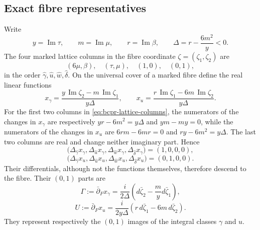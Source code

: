 \subsection{Exact fibre representatives}

Write
\begin{equation}
 y=\operatorname{Im}\tau,
 \qquad m=\operatorname{Im}\mu,
 \qquad r=\operatorname{Im}\beta,
 \qquad \Delta=r-\frac{6m^2}{y}<0.
\label{eq:bcpr-delta}
\end{equation}
The four marked lattice columns in the fibre coordinate
$\zeta=(\zeta_1,\zeta_2)$ are
\begin{equation}
 (6\mu,\beta),\quad(\tau,\mu),\quad(1,0),\quad(0,1),
\label{eq:bcpr-lattice-columns}
\end{equation}
in the order $\widehat\gamma,\widehat u,\widehat w,
\widehat\delta$.  On the universal cover of a marked fibre define the
real linear functions
\begin{equation}
 x_\gamma=
 \frac{y\,\operatorname{Im}\zeta_2-m\,\operatorname{Im}\zeta_1}
      {y\Delta},
 \qquad
 x_u=
 \frac{r\,\operatorname{Im}\zeta_1-6m\,\operatorname{Im}\zeta_2}
      {y\Delta}.
\label{eq:bcpr-real-linear-functions}
\end{equation}
For the first two columns in \cref{eq:bcpr-lattice-columns}, the numerators
of the changes in $x_\gamma$ are respectively
$yr-6m^2=y\Delta$ and $ym-my=0$, while the numerators of the changes in
$x_u$ are $6rm-6mr=0$ and $ry-6m^2=y\Delta$.  The last two columns are
real and change neither imaginary part.  Hence
\[
 \bigl(\Delta_{\widehat\gamma}x_\gamma,
       \Delta_{\widehat u}x_\gamma,
       \Delta_{\widehat w}x_\gamma,
       \Delta_{\widehat\delta}x_\gamma\bigr)=(1,0,0,0),
\]
\begin{equation}
 \bigl(\Delta_{\widehat\gamma}x_u,
       \Delta_{\widehat u}x_u,
       \Delta_{\widehat w}x_u,
       \Delta_{\widehat\delta}x_u\bigr)=(0,1,0,0).
\label{eq:bcpr-linear-function-increments}
\end{equation}
Their differentials, although not the functions themselves, therefore
descend to the fibre.  Their $(0,1)$ parts are
\begin{equation}
 \Gamma:=\bar\partial_Fx_\gamma
 =\frac{i}{2\Delta}
 \left(d\bar\zeta_2-\frac{m}{y}d\bar\zeta_1\right),
\label{eq:bcpr-gamma-form}
\end{equation}
\begin{equation}
 U:=\bar\partial_Fx_u
 =\frac{i}{2y\Delta}
 \left(r\,d\bar\zeta_1-6m\,d\bar\zeta_2\right).
\label{eq:bcpr-u-form}
\end{equation}
They represent respectively the $(0,1)$ images of the integral classes
$\gamma$ and $u$.

